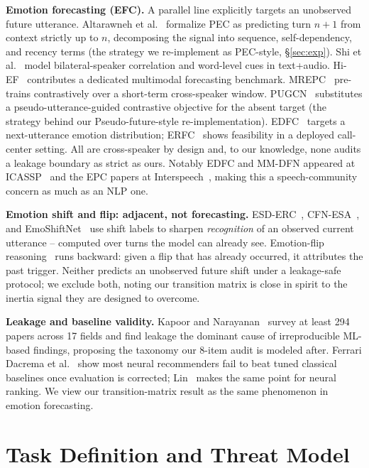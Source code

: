 \documentclass{ieeeaccess}
\begin{document}
\textbf{Emotion forecasting (EFC).} A parallel line explicitly targets an unobserved future
utterance. Altarawneh et al.~\cite{altarawneh2023pec} formalize PEC as predicting turn $n{+}1$ from
context strictly up to $n$, decomposing the signal into sequence, self-dependency, and recency
terms (the strategy we re-implement as PEC-style, \S\ref{sec:exp}). Shi et
al.~\cite{shi2023epc,shi2024epc} model bilateral-speaker correlation and word-level cues in
text+audio. Hi-EF~\cite{wang2024hief} contributes a dedicated multimodal forecasting benchmark.
MREPC~\cite{ju2023mrepc} pre-trains contrastively over a short-term cross-speaker window.
PUGCN~\cite{xie2025pugcn} substitutes a pseudo-utterance-guided contrastive objective for the
absent target (the strategy behind our Pseudo-future-style re-implementation). EDFC~\cite{lu2023edfc}
targets a next-utterance emotion distribution; ERFC~\cite{debsharma2025erfc} shows feasibility in a
deployed call-center setting. All are cross-speaker by design and, to our knowledge, none audits a
leakage boundary as strict as ours. Notably EDFC and MM-DFN appeared at
ICASSP~\cite{lu2023edfc,hu2021mmdfn} and the EPC papers at Interspeech~\cite{shi2023epc,shi2024epc},
making this a speech-community concern as much as an NLP one.

\textbf{Emotion shift and flip: adjacent, not forecasting.} ESD-ERC~\cite{gao2022esderc},
CFN-ESA~\cite{li2024cfnesa}, and EmoShiftNet~\cite{nirujan2025emoshiftnet} use shift labels to
sharpen \emph{recognition} of an observed current utterance -- computed over turns the model can
already see. Emotion-flip reasoning~\cite{kumar2023efr,kumar2024ediref} runs backward: given a flip
that has already occurred, it attributes the past trigger. Neither predicts an unobserved future
shift under a leakage-safe protocol; we exclude both, noting our transition matrix is close in
spirit to the inertia signal they are designed to overcome.

\textbf{Leakage and baseline validity.} Kapoor and Narayanan~\cite{kapoor2023leakage} survey
at least 294 papers across 17 fields and find leakage the dominant cause of irreproducible
ML-based findings, proposing the taxonomy our 8-item audit is modeled after. Ferrari Dacrema et
al.~\cite{dacrema2019recsys} show most neural recommenders fail to beat tuned classical baselines
once evaluation is corrected; Lin~\cite{lin2019neuralhype} makes the same point for neural ranking.
We view our transition-matrix result as the same phenomenon in emotion forecasting.

\section{Task Definition and Threat Model}
\label{sec:task}
\end{document}
